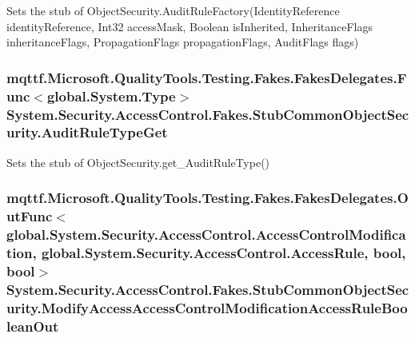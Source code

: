 Sets the stub of Object\-Security.\-Audit\-Rule\-Factory(\-Identity\-Reference identity\-Reference, Int32 access\-Mask, Boolean is\-Inherited, Inheritance\-Flags inheritance\-Flags, Propagation\-Flags propagation\-Flags, Audit\-Flags flags)

\hypertarget{class_system_1_1_security_1_1_access_control_1_1_fakes_1_1_stub_common_object_security_aa12f3116da48176bc383e21114a9b867}{
\subsubsection[{Audit\-Rule\-Type\-Get}]{\setlength{\rightskip}{0pt plus 5cm}mqttf.\-Microsoft.\-Quality\-Tools.\-Testing.\-Fakes.\-Fakes\-Delegates.\-Func$<$global.\-System.\-Type$>$ System.\-Security.\-Access\-Control.\-Fakes.\-Stub\-Common\-Object\-Security.\-Audit\-Rule\-Type\-Get}}\label{class_system_1_1_security_1_1_access_control_1_1_fakes_1_1_stub_common_object_security_aa12f3116da48176bc383e21114a9b867}


Sets the stub of Object\-Security.\-get\-\_\-\-Audit\-Rule\-Type()

\hypertarget{class_system_1_1_security_1_1_access_control_1_1_fakes_1_1_stub_common_object_security_a4698d50721edf758bc6897d9e42b88e9}{
\subsubsection[{Modify\-Access\-Access\-Control\-Modification\-Access\-Rule\-Boolean\-Out}]{\setlength{\rightskip}{0pt plus 5cm}mqttf.\-Microsoft.\-Quality\-Tools.\-Testing.\-Fakes.\-Fakes\-Delegates.\-Out\-Func$<$global.\-System.\-Security.\-Access\-Control.\-Access\-Control\-Modification, global.\-System.\-Security.\-Access\-Control.\-Access\-Rule, bool, bool$>$ System.\-Security.\-Access\-Control.\-Fakes.\-Stub\-Common\-Object\-Security.\-Modify\-Access\-Access\-Control\-Modification\-Access\-Rule\-Boolean\-Out}}\label{class_system_1_1_security_1_1_access_control_1_1_fakes_1_1_stub_common_object_security_a4698d50721edf758bc6897d9e42b88e9}


